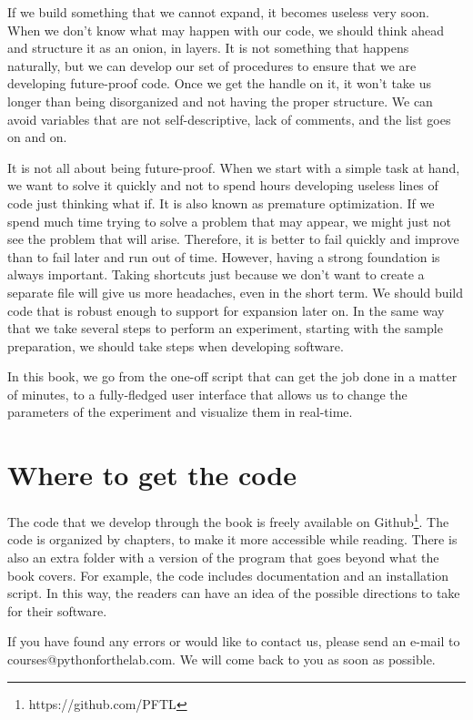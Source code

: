 If we build something that we cannot expand, it becomes useless very soon. When we don't know what may happen with our code, we should think ahead and structure it as an onion, in layers. It is not something that happens naturally, but we can develop our set of procedures to ensure that we are developing future-proof code. Once we get the handle on it, it won't take us longer than being disorganized and not having the proper structure. We can avoid variables that are not self-descriptive, lack of comments, and the list goes on and on.

It is not all about being future-proof. When we start with a simple task at hand, we want to solve it quickly and not to spend hours developing useless lines of code just thinking what if. It is also known as premature optimization. If we spend much time trying to solve a problem that may appear, we might just not see the problem that will arise. Therefore, it is better to fail quickly and improve than to fail later and run out of time. However, having a strong foundation is always important. Taking shortcuts just because we don't want to create a separate file will give us more headaches, even in the short term. We should build code that is robust enough to support for expansion later on. In the same way that we take several steps to perform an experiment, starting with the sample preparation, we should take steps when developing software.

In this book, we go from the one-off script that can get the job done in a matter of minutes, to a fully-fledged user interface that allows us to change the parameters of the experiment and visualize them in real-time.

\section{Where to get the code}\label{sec:where-to-get-the-code}
The code that we develop through the book is freely available on Github\footnote{https://github.com/PFTL}. The code is organized by chapters, to make it more accessible while reading. There is also an extra folder with a version of the program that goes beyond what the book covers. For example, the code includes documentation and an installation script. In this way, the readers can have an idea of the possible directions to take for their software.

If you have found any errors or would like to contact us, please send an e-mail to courses@pythonforthelab.com. We will come back to you as soon as possible.

